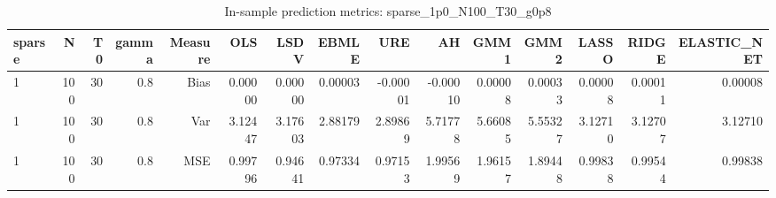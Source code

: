 \begin{table}[!htbp]\centering
\caption{In-sample prediction metrics: sparse_1p0_N100_T30_g0p8}
\label{tab:table2_sparse_1p0_N100_T30_g0p8}
\begin{tabular}{lrrrrrrrrrrrrrr}
\hline
sparse & N & T0 & gamma & Measure & OLS & LSDV & EBMLE & URE & AH & GMM1 & GMM2 & LASSO & RIDGE & ELASTIC_NET \\
\hline
1 & 100 & 30 & 0.8 & Bias & 0.00000 & 0.00000 & 0.00003 & -0.00001 & -0.00010 & 0.00008 & 0.00033 & 0.00008 & 0.00011 & 0.00008 \\
1 & 100 & 30 & 0.8 & Var & 3.12447 & 3.17603 & 2.88179 & 2.89869 & 5.71778 & 5.66085 & 5.55327 & 3.12710 & 3.12707 & 3.12710 \\
1 & 100 & 30 & 0.8 & MSE & 0.99796 & 0.94641 & 0.97334 & 0.97153 & 1.99569 & 1.96157 & 1.89448 & 0.99838 & 0.99544 & 0.99838 \\
\hline
\end{tabular}
\end{table}


